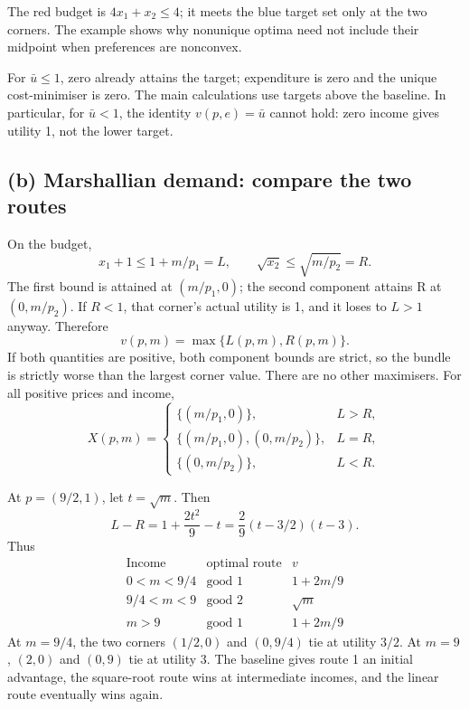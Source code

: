 \documentclass[11pt,a4paper]{article}
\begin{document}
\begin{center}
\end{center}
The red budget is $4x_1+x_2\le4$; it meets the blue target set only at
the two corners. The example shows why nonunique optima need not include
their midpoint when preferences are nonconvex.

For $\bar u\le1$, zero already attains the target; expenditure is zero and
the unique cost-minimiser is zero. The main calculations use targets above
the baseline. In particular, for $\bar u<1$, the identity $v(p,e)=\bar u$
cannot hold: zero income gives utility 1, not the lower target.

\subsection*{(b) Marshallian demand: compare the two routes}
On the budget,
\[
 x_1+1\le1+m/p_1=L,\qquad \sqrt{x_2}\le\sqrt{m/p_2}=R.
\]
The first bound is attained at $(m/p_1,0)$; the second component attains R
at $(0,m/p_2)$. If $R<1$, that corner's actual utility is 1, and it loses
to $L>1$ anyway. Therefore
\[
 \boxed{v(p,m)=\max\{L(p,m),R(p,m)\}}.
\]
If both quantities are positive, both component bounds are strict, so the
bundle is strictly worse than the largest corner value. There are no other
maximisers. For all positive prices and income,
\[
 \boxed{X(p,m)=
 \begin{cases}
 \{(m/p_1,0)\},&L>R,\\
 \{(m/p_1,0),(0,m/p_2)\},&L=R,\\
 \{(0,m/p_2)\},&L<R.
 \end{cases}}
\]

At $p=(9/2,1)$, let $t=\sqrt m$. Then
\[
 L-R=1+\frac{2t^2}{9}-t
     =\frac29(t-3/2)(t-3).
\]
Thus
\[
\begin{array}{c|c|c}
\text{Income}&\text{optimal route}&v\\\hline
0<m<9/4&\text{good 1}&1+2m/9\\
9/4<m<9&\text{good 2}&\sqrt m\\
m>9&\text{good 1}&1+2m/9
\end{array}
\]
At $m=9/4$, the two corners $(1/2,0)$ and $(0,9/4)$ tie at utility $3/2$.
At $m=9$, $(2,0)$ and $(0,9)$ tie at utility 3. The baseline gives route 1
an initial advantage, the square-root route wins at intermediate incomes,
and the linear route eventually wins again.
\end{document}
